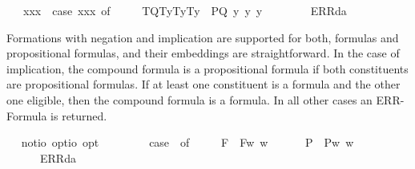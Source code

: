 \begin{isabellebody}
\ \ \ {\isachardoublequoteopen}{\isasymlparr}{\isasymPhi}{\isacharcomma}x{}{\isacharcomma}x{}{\isacharcomma}x{}{\isasymrparr}\ {\isasymequiv}\ case\ {\isacharparenleft}{\isasymPhi}{\isacharcomma}x{}{\isacharcomma}x{}{\isacharcomma}x{}{\isacharparenright}\ of\ \isanewline
\ \ \ \ {\isacharparenleft}T{\isacharparenleft}Q{\isacharparenright}{\isacharcomma}T{\isacharparenleft}y{}{\isacharparenright}{\isacharcomma}T{\isacharparenleft}y{}{\isacharparenright}{\isacharcomma}T{\isacharparenleft}y{}{\isacharparenright}{\isacharparenright}\ {\isasymRightarrow}\ P{\isacharparenleft}{\isacharparenleft}Q\ y{}\ y{}\ y{}{\isacharparenright}{\isacharparenright}\ {\isacharbar}\ \isanewline
\ \ \ \ {\isacharunderscore}\ {\isasymRightarrow}\ ERR{\isacharparenleft}da{\isacharparenright}{\isachardoublequoteclose}%
\begin{isamarkuptext}%
Formations with negation and implication are supported for both, formulas and propositional
  formulas, and their embeddings are straightforward. In the case of implication, the compound formula
  is a propositional formula if both constituents are propositional formulas. If at least one constituent 
  is a formula and the other one eligible, then the compound formula is a formula. In all other
  cases an ERR-Formula is returned.%
\end{isamarkuptext}\isamarkuptrue%
\ \isamarkupfalse%
\ not{\isacharcolon}{\isacharcolon}{\isachardoublequoteopen}io\ opt{\isasymRightarrow}io\ opt{\isachardoublequoteclose}\ {\isacharparenleft}{\isachardoublequoteopen}\isactrlbold {\isasymnot}\ {\isacharunderscore}{\isachardoublequoteclose}\ {\isacharbrackleft}{}{}{\isacharbrackright}\ {}{}{\isacharparenright}\ \ {\isachardoublequoteopen}\isactrlbold {\isasymnot}\ {\isasymphi}\ {\isasymequiv}\ case\ {\isasymphi}\ of\ \isanewline
\ \ \ \ F{\isacharparenleft}{\isasympsi}{\isacharparenright}\ {\isasymRightarrow}\ F{\isacharparenleft}{\isasymlambda}w{\isachardot}{\isasymnot}{\isacharparenleft}{\isasympsi}\ w{\isacharparenright}{\isacharparenright}\ {\isacharbar}\ \isanewline
\ \ \ \ P{\isacharparenleft}{\isasympsi}{\isacharparenright}\ {\isasymRightarrow}\ P{\isacharparenleft}{\isasymlambda}w{\isachardot}{\isasymnot}{\isacharparenleft}{\isasympsi}\ w{\isacharparenright}{\isacharparenright}\ {\isacharbar}\ \isanewline
\ \ \ \ {\isacharunderscore}\ {\isasymRightarrow}\ ERR{\isacharparenleft}da{\isacharparenright}{\isachardoublequoteclose}\ \ \isanewline

\end{isabellebody}

